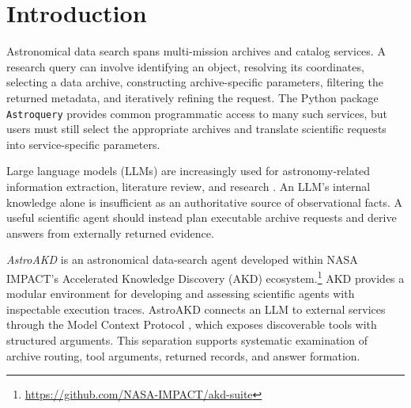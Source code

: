 \documentclass[11pt,twoside]{article}
\begin{document}



\section{Introduction}
Astronomical data search spans multi-mission archives and catalog services. A research query can involve identifying an object, resolving its coordinates, selecting a data archive, constructing archive-specific parameters, filtering the returned metadata, and iteratively refining the request. The Python package {\tt Astroquery} \citep{Ginsburg2019} provides common programmatic access to many such services, but users must still select the appropriate archives and translate scientific requests into service-specific parameters.

Large language models (LLMs) are increasingly used for astronomy-related information extraction, literature review, and research \citep[e.g.,][]{Grezes2024,Iyer2024,Shao2024,Ting2025}. An LLM's internal knowledge alone is insufficient as an authoritative source of observational facts. A useful scientific agent should instead plan executable archive requests and derive answers from externally returned evidence.

\textit{AstroAKD} is an astronomical data-search agent developed within NASA IMPACT's Accelerated Knowledge Discovery (AKD) ecosystem.\footnote{\url{https://github.com/NASA-IMPACT/akd-suite}} AKD provides a modular environment for developing and assessing scientific agents with inspectable execution traces. AstroAKD connects an LLM to external services through the Model Context Protocol \citep[MCP, e.g.,][]{Hou2026,Stratis2026}, which exposes discoverable tools with structured arguments. This separation supports systematic examination of archive routing, tool arguments, returned records, and answer formation.
\end{document}

